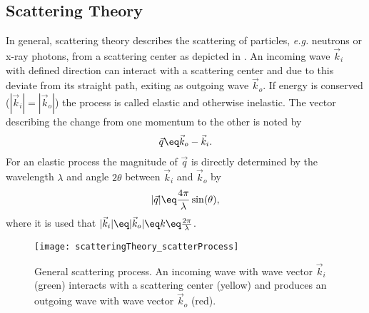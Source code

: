 \documentclass[\main/dresen_thesis.tex]{subfiles}
\begin{document}
  \subsection{Scattering Theory}\label{sec:theoreticalBackground:scattering:scatteringTheory}
    In general, scattering theory describes the scattering of particles, \textit{e.g.} neutrons or x-ray photons, from a scattering center as depicted in . An incoming wave $\vec{k}_i$ with defined direction can interact with a scattering center and due to this deviate from its straight path, exiting as outgoing wave $\vec{k}_o$.
    If energy is conserved ($|\vec{k}_i| = |\vec{k}_o|$) the process is called elastic and otherwise inelastic.
    The vector describing the change from one momentum to the other is noted by
    \begin{align}
      \vec{q} \eq \vec{k}_o - \vec{k}_i.
    \end{align}
    For an elastic process the magnitude of $\vec{q}$ is directly determined by the wavelength $\lambda$ and angle $2\theta$ between $\vec{k}_i$ and $\vec{k}_o$ by
    \begin{align}
      |\vec{q}| \eq \frac{4 \pi}{\lambda} \sin(\theta),
    \end{align}
    where it is used that $|\vec{k}_i| \eq |\vec{k}_o| \eq k \eq \frac{2 \pi}{\lambda}$.

    \begin{figure}[tb]
      \centering
      \texttt{[image: scatteringTheory\_scatterProcess]}
      \caption{\label{fig:theoreticalBackground:scattering:scatteringTheory:scatteringProcess}General scattering process. An incoming wave with wave vector $\vec{k}_i$ (green) interacts with a scattering center (yellow) and produces an outgoing wave with wave vector $\vec{k}_o$ (red).}
    \end{figure}
\end{document}
